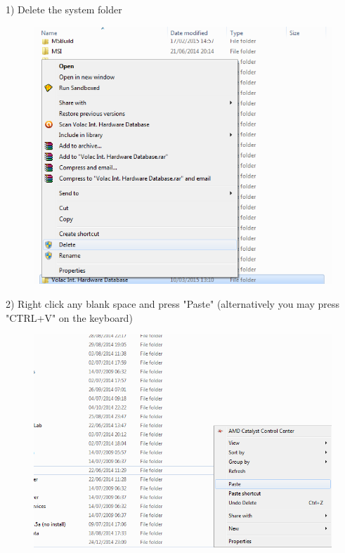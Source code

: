 1) Delete the system folder

\begin{figure}[H]
    \includegraphics[width=\textwidth]{./Manual/Images/restore1delete.png}
\end{figure}

2) Right click any blank space and press "Paste" (alternatively you may press "CTRL+V" on the keyboard)

\begin{figure}[H]
    \includegraphics[width=\textwidth]{./Manual/Images/restore1delete2.png}
\end{figure}


